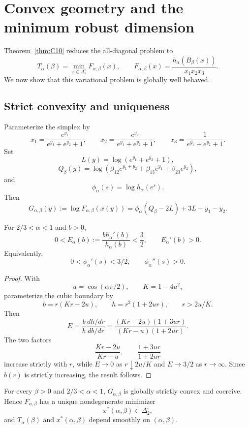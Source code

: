 \section{Convex geometry and the minimum robust dimension}
\label{sec:threshold-geometry}

Theorem~\ref{thm:C10} reduces the all-diagonal problem to
\[
T_\alpha(\beta)
=
\min_{x\in\Delta_2^\circ}
F_{\alpha,\beta}(x),
\qquad
F_{\alpha,\beta}(x)
=
\frac{h_\alpha(B_\beta(x))}{x_1x_2x_3}.
\]
We now show that this variational problem is globally well behaved.

\subsection{Strict convexity and uniqueness}

Parameterize the simplex by
\[
x_1=\frac{e^{y_1}}{e^{y_1}+e^{y_2}+1},
\qquad
x_2=\frac{e^{y_2}}{e^{y_1}+e^{y_2}+1},
\qquad
x_3=\frac1{e^{y_1}+e^{y_2}+1}.
\]
Set
\[
L(y)=\log(e^{y_1}+e^{y_2}+1),
\]
\[
Q_\beta(y)
=
\log\!\left(
\beta_{12}e^{y_1+y_2}
+\beta_{13}e^{y_1}
+\beta_{23}e^{y_2}
\right),
\]
and
\[
\phi_\alpha(s)=\log h_\alpha(e^s).
\]
Then
\[
G_{\alpha,\beta}(y)
:=
\log F_{\alpha,\beta}(x(y))
=
\phi_\alpha(Q_\beta-2L)+3L-y_1-y_2.
\]

\begin{lemma}
\label{lem:elasticity-sub}
For \(2/3<\alpha<1\) and \(b>0\),
\[
0<
E_\alpha(b)
:=
\frac{b h_\alpha'(b)}{h_\alpha(b)}
<
\frac32,
\qquad
E_\alpha'(b)>0.
\]
Equivalently,
\[
0<\phi_\alpha'(s)<3/2,
\qquad
\phi_\alpha''(s)>0.
\]
\end{lemma}

\begin{proof}
With
\[
u=\cos(\alpha\pi/2),
\qquad
K=1-4u^2,
\]
parameterize the cubic boundary by
\[
b=r(Kr-2u),
\qquad
h=r^2(1+2ur),
\qquad
r>2u/K.
\]
Then
\[
E
=
\frac{b}{h}\frac{dh/dr}{db/dr}
=
\frac{(Kr-2u)(1+3ur)}
{(Kr-u)(1+2ur)}.
\]
The two factors
\[
\frac{Kr-2u}{Kr-u},
\qquad
\frac{1+3ur}{1+2ur}
\]
increase strictly with \(r\), while \(E\to0\) as \(r\downarrow2u/K\) and \(E\to3/2\) as \(r\to\infty\). Since \(b(r)\) is strictly increasing, the result follows.
\end{proof}

\begin{theorem}
\label{thm:strict-convexity}
For every \(\beta>0\) and \(2/3<\alpha<1\), \(G_{\alpha,\beta}\) is globally strictly convex and coercive. Hence \(F_{\alpha,\beta}\) has a unique nondegenerate minimizer
\[
x^*(\alpha,\beta)\in\Delta_2^\circ,
\]
and \(T_\alpha(\beta)\) and \(x^*(\alpha,\beta)\) depend smoothly on \((\alpha,\beta)\).
\end{theorem}

